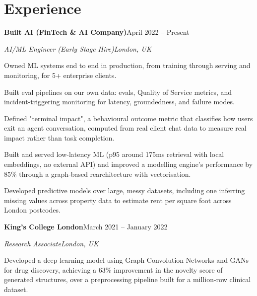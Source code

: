 \documentclass[10pt,a4paper]{article}
\newcommand{\entry}[4]{%
  {\color{company}\bfseries #1}\hfill {\color{muted}#2}\par
  \vspace{1pt}
  {\itshape #3}\hfill {\color{muted}\itshape #4}\par
  \vspace{3pt}%
}
\begin{document}
\section{Experience}
\entry{Built AI (FinTech \& AI Company)}{April 2022 -- Present}{AI/ML Engineer (Early Stage Hire)}{London, UK}
\begin{tight}
  \item Owned ML systems end to end in production, from training through serving and monitoring, for 5+ enterprise clients.
  \item Built eval pipelines on our own data: evals, Quality of Service metrics, and incident-triggering monitoring for latency, groundedness, and failure modes.
  \item Defined "terminal impact", a behavioural outcome metric that classifies how users exit an agent conversation, computed from real client chat data to measure real impact rather than task completion.
  \item Built and served low-latency ML (p95 around 175ms retrieval with local embeddings, no external API) and improved a modelling engine's performance by 85\% through a graph-based rearchitecture with vectorisation.
  \item Developed predictive models over large, messy datasets, including one inferring missing values across property data to estimate rent per square foot across London postcodes.
\end{tight}

\entry{King's College London}{March 2021 -- January 2022}{Research Associate}{London, UK}
\begin{tight}
  \item Developed a deep learning model using Graph Convolution Networks and GANs for drug discovery, achieving a 63\% improvement in the novelty score of generated structures, over a preprocessing pipeline built for a million-row clinical dataset.
\end{tight}

\end{document}
